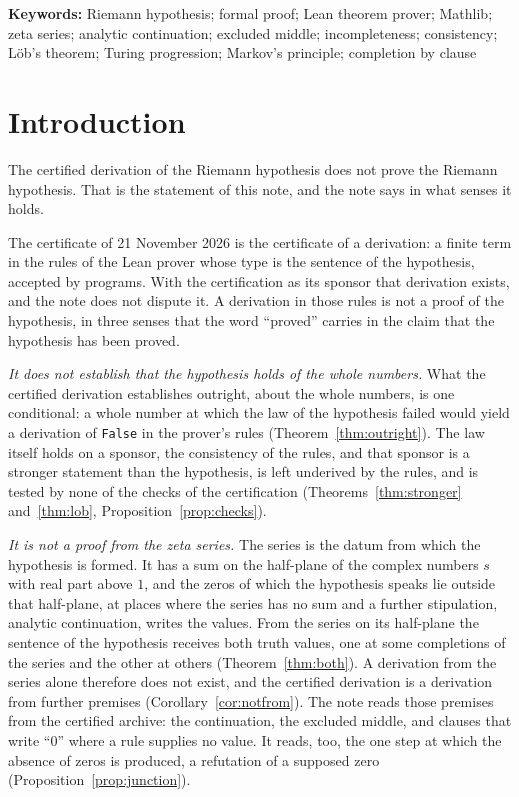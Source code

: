 \documentclass[11pt]{article}
\theoremstyle{definition}
\theoremstyle{remark}
\DeclareRobustCommand{\lean}[1]{{\renewcommand{\_}{\textunderscore\allowbreak}\texttt{#1}}}
\newcommand{\False}{\lean{False}}
\begin{document}
\noindent\textbf{Keywords:} Riemann hypothesis; formal proof; Lean theorem prover; Mathlib; zeta series; analytic continuation; excluded middle; incompleteness; consistency; L\"ob's theorem; Turing progression; Markov's principle; completion by clause


\section{Introduction}\label{sec:intro}

The certified derivation of the Riemann hypothesis does not prove the Riemann hypothesis. That is the statement of this note, and the note says in what senses it holds.

The certificate of 21 November 2026 is the certificate of a derivation: a finite term in the rules of the Lean prover whose type is the sentence of the hypothesis, accepted by programs. With the certification as its sponsor that derivation exists, and the note does not dispute it. A derivation in those rules is not a proof of the hypothesis, in three senses that the word ``proved'' carries in the claim that the hypothesis has been proved.

\emph{It does not establish that the hypothesis holds of the whole numbers.} What the certified derivation establishes outright, about the whole numbers, is one conditional: a whole number at which the law of the hypothesis failed would yield a derivation of \False{} in the prover's rules (Theorem~\ref{thm:outright}). The law itself holds on a sponsor, the consistency of the rules, and that sponsor is a stronger statement than the hypothesis, is left underived by the rules, and is tested by none of the checks of the certification (Theorems~\ref{thm:stronger} and~\ref{thm:lob}, Proposition~\ref{prop:checks}).

\emph{It is not a proof from the zeta series.} The series is the datum from which the hypothesis is formed. It has a sum on the half-plane of the complex numbers $s$ with real part above $1$, and the zeros of which the hypothesis speaks lie outside that half-plane, at places where the series has no sum and a further stipulation, analytic continuation, writes the values. From the series on its half-plane the sentence of the hypothesis receives both truth values, one at some completions of the series and the other at others (Theorem~\ref{thm:both}). A derivation from the series alone therefore does not exist, and the certified derivation is a derivation from further premises (Corollary~\ref{cor:notfrom}). The note reads those premises from the certified archive: the continuation, the excluded middle, and clauses that write ``0'' where a rule supplies no value. It reads, too, the one step at which the absence of zeros is produced, a refutation of a supposed zero (Proposition~\ref{prop:junction}).
\end{document}
